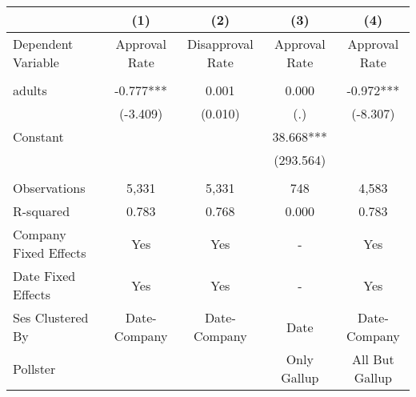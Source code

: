 \begin{tabular}{lcccc}
\toprule
{} &            (1) &               (2) &            (3) &             (4) \\
\midrule
Dependent Variable    &  Approval Rate &  Disapproval Rate &  Approval Rate &   Approval Rate \\
                      &                &                   &                &                 \\
adults                &      -0.777*** &             0.001 &          0.000 &       -0.972*** \\
                      &       (-3.409) &           (0.010) &            (.) &        (-8.307) \\
Constant              &                &                   &      38.668*** &                 \\
                      &                &                   &      (293.564) &                 \\
                      &                &                   &                &                 \\
Observations          &          5,331 &             5,331 &            748 &           4,583 \\
R-squared             &          0.783 &             0.768 &          0.000 &           0.783 \\
Company Fixed Effects &            Yes &               Yes &              - &             Yes \\
Date Fixed Effects    &            Yes &               Yes &              - &             Yes \\
Ses Clustered By      &   Date-Company &      Date-Company &           Date &    Date-Company \\
Pollster              &                &                   &    Only Gallup &  All But Gallup \\
\bottomrule
\end{tabular}
